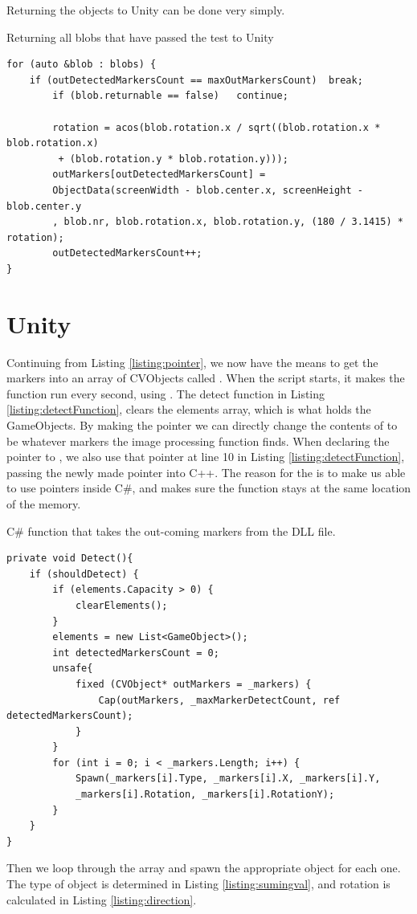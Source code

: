 Returning the objects to Unity can be done very simply. 
 \begin{listing}[H]
	\caption{Returning all blobs that have passed the test to Unity}
	\begin{verbatim}
for (auto &blob : blobs) {
	if (outDetectedMarkersCount == maxOutMarkersCount)	break;
		if (blob.returnable == false)	continue;
		
		rotation = acos(blob.rotation.x / sqrt((blob.rotation.x * blob.rotation.x)
		 + (blob.rotation.y * blob.rotation.y)));
		outMarkers[outDetectedMarkersCount] = 
		ObjectData(screenWidth - blob.center.x, screenHeight - blob.center.y
		, blob.nr, blob.rotation.x, blob.rotation.y, (180 / 3.1415) * rotation);
		outDetectedMarkersCount++;
}
	\end{verbatim}
	\label{listing:return}
\end{listing}
\section{Unity}
	Continuing from Listing \ref{listing:pointer}, we now have the means to get the markers into an array of CVObjects called . When the script starts, it makes the  function run every second, using . The detect function in Listing \ref{listing:detectFunction}, clears the elements array, which is what holds the GameObjects. By making the pointer  we can directly change the contents of  to be whatever markers the image processing function finds. When declaring the pointer to , we also use that pointer at line 10 in Listing \ref{listing:detectFunction}, passing the newly made pointer into C++. The reason for the  is to make us able to use pointers inside C\#, and  makes sure the function stays at the same location of the memory.
	\begin{listing}[H]
		\caption{C\# function that takes the out-coming markers from the DLL file.}
		\begin{verbatim}
private void Detect(){
	if (shouldDetect) {
		if (elements.Capacity > 0) {
			clearElements();
		}
		elements = new List<GameObject>();
		int detectedMarkersCount = 0;
		unsafe{
			fixed (CVObject* outMarkers = _markers) {
				Cap(outMarkers, _maxMarkerDetectCount, ref detectedMarkersCount);
			}
		}
		for (int i = 0; i < _markers.Length; i++) {
			Spawn(_markers[i].Type, _markers[i].X, _markers[i].Y,
			_markers[i].Rotation, _markers[i].RotationY);
		}
	}
}
	\end{verbatim}
\label{listing:detectFunction}
\end{listing}
Then we loop through the  array and spawn the appropriate object for each one. The type of object is determined in Listing \ref{listing:sumingval}, and rotation is calculated in Listing \ref{listing:direction}.\\

